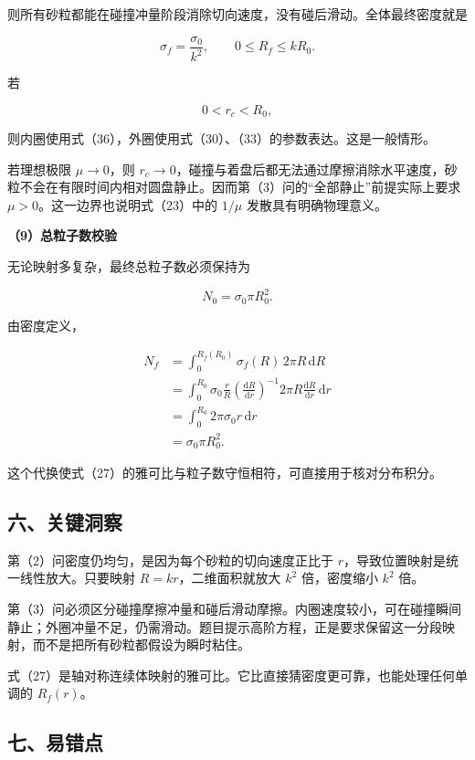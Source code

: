 \documentclass[12pt,a4paper,UTF8]{ctexart}
\begin{document}
则所有砂粒都能在碰撞冲量阶段消除切向速度，没有碰后滑动。全体最终密度就是

\[
\boxed{
\sigma_f=\frac{\sigma_0}{k^2},
\qquad
0\leq R_f\leq kR_0
}.
\tag{36}
\]

若

\[
0<r_c<R_0,
\]

则内圈使用式（36），外圈使用式（30）、（33）的参数表达。这是一般情形。

若理想极限 \(\mu\to0\)，则
\(r_c\to0\)，碰撞与着盘后都无法通过摩擦消除水平速度，砂粒不会在有限时间内相对圆盘静止。因而第（3）问的``全部静止''前提实际上要求
\(\mu>0\)。这一边界也说明式（23）中的 \(1/\mu\) 发散具有明确物理意义。

\begingroup
\samepage

\textbf{（9）总粒子数校验}

无论映射多复杂，最终总粒子数必须保持为

\[
N_0=\sigma_0\pi R_0^2.
\tag{37}
\]

由密度定义，

\[
\begin{aligned}
N_f
&=\int_0^{R_f(R_0)}
\sigma_f(R)\,2\pi R\,\mathrm dR\\
&=\int_0^{R_0}
\sigma_0\frac rR
\left(\frac{\mathrm dR}{\mathrm dr}\right)^{-1}
2\pi R\frac{\mathrm dR}{\mathrm dr}\,\mathrm dr\\
&=\int_0^{R_0}2\pi\sigma_0r\,\mathrm dr\\
&=\sigma_0\pi R_0^2.
\end{aligned}
\tag{38}
\]

这个代换使式（27）的雅可比与粒子数守恒相符，可直接用于核对分布积分。

\endgroup

\subsection{六、关键洞察}\label{ux516dux5173ux952eux6d1eux5bdf-2}

第（2）问密度仍均匀，是因为每个砂粒的切向速度正比于
\(r\)，导致位置映射是统一线性放大。只要映射 \(R=kr\)，二维面积就放大
\(k^2\) 倍，密度缩小 \(k^2\) 倍。

第（3）问必须区分碰撞摩擦冲量和碰后滑动摩擦。内圈速度较小，可在碰撞瞬间静止；外圈冲量不足，仍需滑动。题目提示高阶方程，正是要求保留这一分段映射，而不是把所有砂粒都假设为瞬时粘住。

式（27）是轴对称连续体映射的雅可比。它比直接猜密度更可靠，也能处理任何单调的
\(R_f(r)\)。

\subsection{七、易错点}\label{ux4e03ux6613ux9519ux70b9-2}
\end{document}
